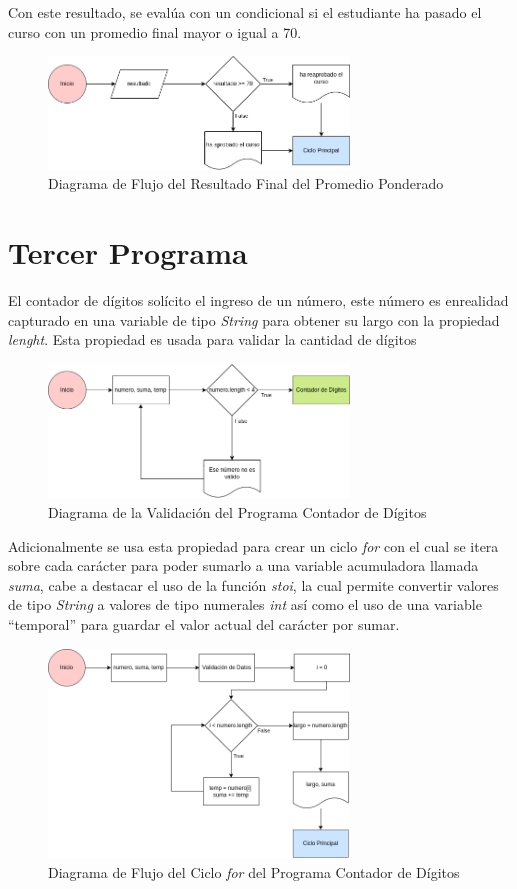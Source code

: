 \documentclass{article}
\begin{document}
Con este resultado, se evalúa con un condicional si el estudiante ha pasado el curso con un promedio final mayor o igual a 70.

\begin{figure}[H]
    \centering
    \includegraphics[width=8cm]{promedio_ponderado_salida}
    \caption{Diagrama de Flujo del Resultado Final del Promedio Ponderado}
\end{figure}

\section{Tercer Programa}

El contador de dígitos solícito el ingreso de un número, este número es enrealidad capturado en una variable de tipo \emph{String} para obtener su largo con la propiedad \emph{lenght}. Esta propiedad es usada para validar la cantidad de dígitos 

\begin{figure}[H]
    \centering
    \includegraphics[width=8cm]{contador_digitos_validacion}
    \caption{Diagrama de la Validación del Programa Contador de Dígitos}
\end{figure}

Adicionalmente se usa esta propiedad para crear un ciclo \emph{for} con el cual se itera sobre cada carácter para poder sumarlo a una variable acumuladora llamada \emph{suma}, cabe a destacar el uso de la función \emph{stoi}, la cual permite convertir valores de tipo \emph{String} a valores de tipo numerales \emph{int} así como el uso de una variable ``temporal'' para guardar el valor actual del carácter por sumar.

\begin{figure}[H]
    \centering
    \includegraphics[width=8cm]{contador_digitos_ciclo}
    \caption{Diagrama de Flujo del Ciclo \emph{for} del Programa Contador de Dígitos}
\end{figure}
\end{document}
